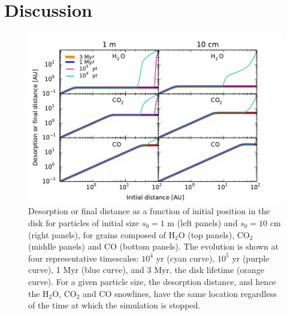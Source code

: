 \documentclass[apj]{emulateapj}
\begin{document}

\section{Discussion}
\label{sec:discussion}

\begin{figure}[t!]
\centering
\includegraphics[width=\textwidth]{time_plots.pdf}
\caption{Desorption or final distance as a function of initial position in the disk for particles of initial size $s_0=1$ m (left panels) and $s_0=10$ cm (right panels), for grains composed of H$_2$O (top panels), CO$_2$ (middle panels) and CO (bottom panels). The evolution is shown at four representative timescales: $10^4$ yr (cyan curve), $10^5$ yr (purple curve), 1 Myr (blue curve), and 3 Myr, the disk lifetime (orange curve). For a given particle size, the desorption distance, and hence the H$_2$O, CO$_2$ and CO snowlines, have the same location regardless of the time at which the simulation is stopped.}
\label{fig:timeplots}
\end{figure}
\end{document}
